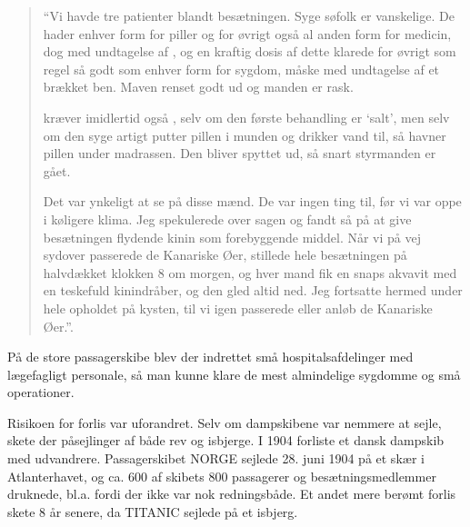 \begin{quote}
    
    ``Vi havde tre patienter blandt besætningen. Syge
    søfolk er vanskelige. De hader enhver form for piller og for øvrigt
    også al anden form for medicin, dog med undtagelse af ,
    og en kraftig dosis af dette klarede for øvrigt som regel så godt som
    enhver form for sygdom, måske med undtagelse af et brækket ben. Maven
    renset godt ud og manden er rask. 
    
     kræver imidlertid også
    , selv
    om den første behandling er `salt', men selv om den syge artigt
    putter pillen i munden og drikker vand til, så havner pillen under
    madrassen. Den bliver spyttet ud, så snart styrmanden er gået. 
    
    Det var ynkeligt at se på disse mænd. De var ingen ting til, før vi
    var oppe i køligere klima.  Jeg spekulerede over sagen og fandt så på
    at give besætningen flydende kinin som forebyggende middel. Når vi på
    vej sydover passerede de Kanariske Øer, stillede hele besætningen på
    halvdækket klokken 8 om morgen, og hver mand fik en snaps akvavit med
    en teskefuld kinindråber, og den gled altid ned. Jeg fortsatte hermed
    under hele opholdet på kysten, til vi igen passerede eller anløb de
    Kanariske Øer.''. 

\end{quote}


På de store passagerskibe blev der indrettet små hospitalsafdelinger med
lægefagligt personale, så man kunne klare de mest almindelige sygdomme og
små operationer. 

Risikoen for forlis var uforandret. Selv om dampskibene var nemmere at
sejle, skete der påsejlinger af både rev og isbjerge. I 1904 forliste et
dansk dampskib med udvandrere.  Passagerskibet NORGE sejlede 28. juni
1904 på et skær i Atlanterhavet, og ca. 600 af skibets 800 passagerer og
besætningsmedlemmer druknede, bl.a. fordi der ikke var nok redningsbåde.
Et andet mere berømt forlis skete 8 år senere, da TITANIC sejlede på et
isbjerg.
